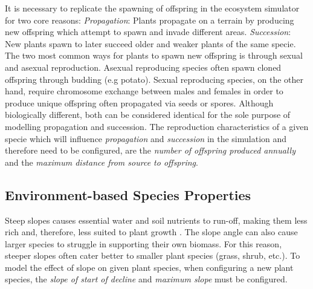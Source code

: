 It is necessary to replicate the spawning of offspring in the ecosystem simulator for two core reasons: \textit{Propagation}: Plants propagate on a terrain by producing new offspring which attempt to spawn and invade different areas. \textit{Succession}: New plants spawn to later succeed older and weaker plants of the same specie.\\ 
The two most common ways for plants to spawn new offspring is through sexual and asexual reproduction. Asexual reproducing species often spawn cloned offspring through budding (e.g potato). Sexual reproducing species, on the other hand, require chromosome exchange between males and females in order to produce unique offspring often propagated via seeds or spores. Although biologically different, both can be considered identical for the sole purpose of modelling propagation and succession. The reproduction characteristics of a given specie which will influence \textit{propagation} and \textit{succession} in the simulation and therefore need to be configured, are the \textit{number of offspring produced annually} and the \textit{maximum distance from source to offspring}.\\

\subsection{Environment-based Species Properties}

Steep slopes causes essential water and soil nutrients to run-off, making them less rich and, therefore, less suited to plant growth \cite{Kapolka2010}. The slope angle can also cause larger species to struggle in supporting their own biomass. For this reason, steeper slopes often cater better to smaller plant species (grass, shrub, etc.). To model the effect of slope on given plant species, when configuring a new plant species, the \textit{slope of start of decline} and \textit{maximum slope} must be configured.\\

